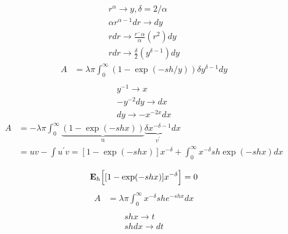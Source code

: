 %
\begin{equation}
  \begin{split}
  r^\alpha \rightarrow y, \delta = 2/\alpha\\
  \alpha r^{\alpha-1}dr \rightarrow dy \\
  r dr \rightarrow \frac{r^-\alpha}{\alpha}(r^2) dy \\
  r dr \rightarrow \frac{\delta}{2}(y^{\delta-1}) dy
  \end{split}
\end{equation}
%
\begin{equation}
  \begin{split}
A &= \lambda \pi \int_0^\infty (1-\exp(-sh/y)) \delta y^{\delta-1}dy \\
  \end{split}
\end{equation}
%
\begin{equation}
  \begin{split}
  y^{-1} \rightarrow x\\
  -y^{-2} dy \rightarrow dx\\
  dy \rightarrow -x^{-2x} dx
  \end{split}
\end{equation}
%
\begin{equation}
  \begin{split}
A &= -\lambda \pi \int_0^\infty \underbrace{(1-\exp(-shx))}_\text{u} \underbrace{ \delta x^{-\delta-1} }_\text{$v^{\prime}$} dx \\
&= uv-\int u^\prime v = [1-\exp(-shx)]x^{-\delta} + \int_0^\infty x^{-\delta} sh \exp(-shx) dx\\
  \end{split}
\end{equation}
%
\begin{equation}
\textbf{E}_{h} \Big[ [1-\exp(-shx)]x^{-\delta} \Big] = 0\\
\end{equation}
%
\begin{equation}
  \begin{split}
A& = \lambda \pi \int_0^\infty x^{-\delta} sh e^{-shx} dx\\
  \end{split}
\end{equation}
%
\begin{equation}
  \begin{split}
  shx \rightarrow t\\
  sh dx \rightarrow dt\\
  \end{split}
\end{equation}
